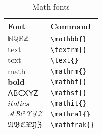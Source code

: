 \begin{table}
  \centering
  \caption{Math fonts}
  \label{tab:math-fonts-1}
  \begin{tabular}{@{}ll@{}}
    \toprule
    Font & Command \\
    \midrule
    $\mathbb{NQRZ}$ & \verb|\mathbb{}| \\
    $\textrm{text}$ & \verb|\textrm{}| \\
    $\text{text}$ & \verb|\text{}| \\
    $\mathrm{math}$ & \verb|\mathrm{}| \\
    $\mathbf{bold}$ & \verb|\mathbf{}| \\
    $\mathsf{ABCXYZ}$ & \verb|\mathsf{}| \\
    $\mathit{italics}$ & \verb|\mathit{}| \\
    $\mathcal{ABCXYZ}$ & \verb|\mathcal{}| \\
    $\mathfrak{ABCXYZ}$ & \verb|\mathfrak{}| \\
    \bottomrule
  \end{tabular}  
\end{table}

